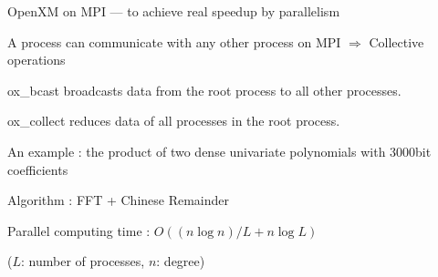 \documentclass{slides}
\begin{document}
\parskip 3pt

\noindent
{\color{red} OpenXM on MPI --- to achieve real speedup by parallelism}

A process can communicate with any other process on MPI
$\Rightarrow$ {\color{green} Collective operations}

{\color{green} ox\_bcast} broadcasts data from the root process to all other
processes.

{\color{green} ox\_collect} reduces  data of all processes in the root process.

\noindent
{\color{red} An example} :
the product of two dense univariate polynomials with 3000bit coefficients

{\color{green} Algorithm} : FFT + Chinese Remainder

{\color{green} Parallel computing time} : $O((n\log n)/L+n\log L)$

($L$: number of processes, $n$: degree)

\epsfxsize=17cm
\end{document}
